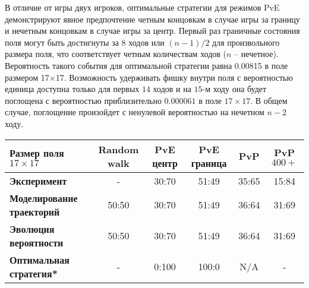 В отличие от игры двух игроков, оптимальные стратегии для режимов PvE демонстрируют явное предпочтение четным концовкам в случае игры за границу и 
нечетным концовкам в случае игры за центр. Первый раз граничные состояния поля могут быть достигнуты за $8$ ходов или $(n-1)/2$ для произвольного размера поля, 
что соответствует четным количествам ходов ($n$ – нечетное). Вероятность такого события для оптимальной стратегии равна 0.00815 в поле размером 17×17. 
Возможность удерживать фишку внутри поля с вероятностью единица доступна только для первых $14$ ходов и на $15$-м ходу она будет поглощена с вероятностью 
приблизительно $0.000061$ в поле $17 \times 17$. В общем случае, поглощение произойдет с ненулевой вероятностью на нечетном $n-2$ ходу.

\begin{table}[]
    \begin{tabular}{|l|c|c|c|c|c|}%
        \hline
        \toprule
        Размер поля $17 \times 17$ & Random walk & \textbf{PvE центр} & \textbf{PvE граница} & \textbf{PvP} & \textbf{PvP $400+$} \\ \hline
        \midrule
        \textbf{Эксперимент} & -     & 30:70 & 51:49 & 35:65 & 15:84 \\ \hline
        \textbf{Моделирование траекторий} & 50:50 & 30:70 & 51:49 & 36:64 & 31:69 \\
        \textbf{Эволюция вероятности}  & 50:50 & 30:70 & 51:49 & 36:64 & 31:69 \\ \hline
        \textbf{Оптимальная стратегия*}    & -     & 0:100 & 100:0 & N/A   & -     \\ \hline

\end{tabular}
\end{table}
